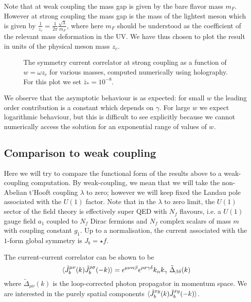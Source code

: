 \documentclass[aps,preprint,nofootinbib,preprintnumbers,eqsecnum,superscriptaddress]{revtex4}
\begin{document}
Note that at weak coupling the mass gap is given by the bare flavor mass $m_F$. However at strong coupling the mass gap is the mass of the lightest meson which is given by $\frac{1}{z_c} = \frac{1}{2\pi}\frac{\sqrt{\lambda}}{m_F}$, where here $m_F$ should be understood as the coefficient of the relevant mass deformation in the UV. We have thus chosen to plot the result in units of the physical meson mass $z_c$. 
\begin{figure}[!ht]
	
	\caption{The symmetry current correlator at strong coupling as a function of $w = \omega z_c$ for various masses, computed numerically using holography. For this plot we set $\bar{z}_* = 10^{-8}$.}
	\label{fig:numerical} 
\end{figure}
We observe that the asymptotic behaviour is as expected: for small $w$ the leading order contribution is a constant which depends on $\gamma$. For large $w$ we expect logarithmic behaviour, but this is difficult to see explicitly because we cannot numerically access the solution for an exponential range of values of $w$.

\subsection{Comparison to weak coupling}
Here we will try to compare the functional form of the results above to a weak-coupling computation. By weak-coupling, we mean that we will take the non-Abelian t'Hooft coupling $\lambda$ to zero; however we will keep fixed the Landau pole associated with the $U(1)$ factor. Note that in the $\lambda$ to zero limit, the $U(1)$ sector of the field theory is effectively super QED with $N_f$ flavours, i.e. a $U(1)$ gauge field $a_1$ coupled to $N_f$ Dirac fermions and $N_f$ complex scalars of mass $m$ with coupling constant $g_1$. Up to a normalisation, the current associated with the $1$-form global symmetry is $J_b = \star f$.

The current-current correlator can be shown to be
\begin{equation}
	\braket{\tilde{J}_b^{\mu \nu}(k)\tilde{J}_b^{\rho \sigma}(-k)}
	= \epsilon^{\mu \nu \alpha \beta} \epsilon^{\rho \sigma \gamma \delta} k_\alpha k_\gamma \; \tilde{\Delta}_{\beta \delta}(k)
\end{equation}
where $\tilde{\Delta}_{\mu \nu}(k)$ is the loop-corrected photon propagator in momentum space. We are interested in the purely spatial components $\braket{\tilde{J}_b^{xy}(k)\tilde{J}_b^{xy}(-k)}$.
\end{document}

